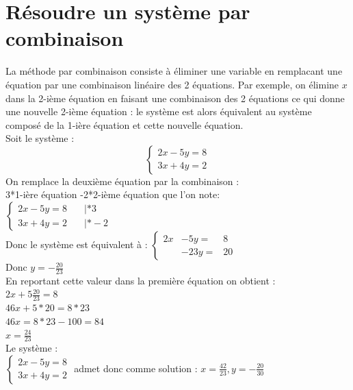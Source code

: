 \documentclass[a4paper,11pt]{book}
\begin{document}
\section{R\'esoudre un syst\`eme par combinaison}
La m\'ethode par combinaison consiste \`a \'eliminer une variable en remplacant
une \'equation par une combinaison lin\'eaire des 2 \'equations. Par exemple, 
on \'elimine $x$ dans la 2-i\`eme \'equation en faisant une combinaison des 
2 \'equations ce qui donne une nouvelle 2-i\`eme \'equation : le syst\`eme est 
alors \'equivalent au syst\`eme compos\'e de la 1-i\`ere \'equation et cette
nouvelle \'equation.\\
Soit le syst\`eme :\\
$$\left\{
\begin{array}{l}
2x-5y=8\\
3x+4y=2
\end{array}
\right.
$$
On remplace la deuxi\`eme \'equation par la combinaison :\\
3*1-i\`ere \'equation -2*2-i\`eme \'equation que l'on note:\\
$\left\{
\begin{array}{lr}
2x-5y=8 &\quad |*3\\
3x+4y=2 &\quad |*-2
\end{array}
\right.
$\\
Donc le syst\`eme est \'equivalent \`a :
$\left\{
\begin{array}{rrr}
2x&-5y=&8 \\
&-23y=&20
\end{array}
\right.
$\\
Donc $\displaystyle y=-\frac{20}{23}$\\
En reportant cette valeur dans la premi\`ere \'equation on obtient :\\
$\displaystyle 2x+5\frac{20}{23}=8$\\
$46x+5*20=8*23$\\
$46x=8*23-100=84$\\
$\displaystyle x=\frac{24}{23}$\\
Le syst\`eme :\\
$\left\{
\begin{array}{l}
2x-5y=8\\
3x+4y=2
\end{array}
\right.
$ admet donc comme solution :
$\displaystyle x=\frac{42}{23},y=-\frac{20}{30}$
\end{document}
